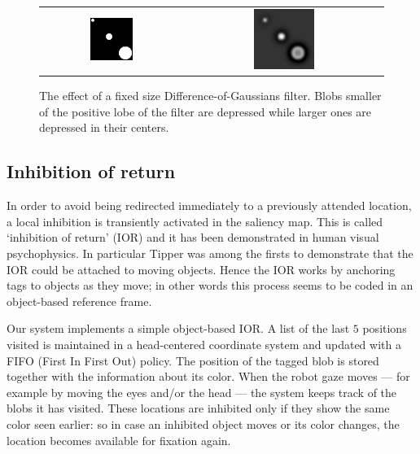 \documentclass{llncs}
\begin{document}
\begin{figure}[]
  \begin{center}
    \begin{tabular}{cc}
       \includegraphics[width=0.32\textwidth]{figs/attention/dog1} &
       \includegraphics[width=0.32\textwidth]{figs/attention/dog2}
    \end{tabular}
    \caption{\label{fig:multiscale}The effect of a fixed size Difference-of-Gaussians filter.
     Blobs smaller of the positive lobe of the filter are depressed while larger
     ones are depressed in their centers.}
  \end{center}
\end{figure}

\subsection{Inhibition of return}
In order to avoid being redirected immediately to a
previously attended location, a local inhibition is
transiently activated in the saliency map. This is called
`inhibition of return' (IOR) and it has been
demonstrated in human visual psychophysics.
In particular Tipper \cite{Tipper91} was among the firsts to
demonstrate that the IOR could be attached to moving objects.
Hence the IOR works by anchoring tags to
objects as they move; in other words this process seems
to be coded in an object-based reference frame.

Our system implements a simple object-based IOR.
A list of the last $5$ positions visited is
maintained in a head-centered coordinate system and
updated with a FIFO (First In First Out) policy. The
position of the tagged blob is stored together with the
information about its color. When the robot gaze
moves --- for example by moving the eyes and/or the
head --- the system keeps track of the blobs it has
visited. These locations are inhibited only if they show
the same color seen earlier: so in case an inhibited
object moves or its color changes, the location
becomes available for fixation again.
\end{document}
